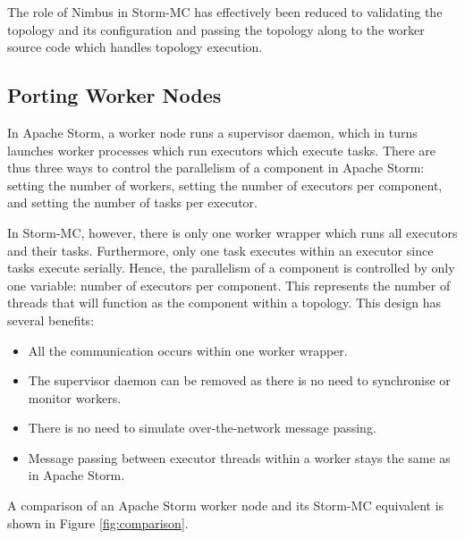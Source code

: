 \documentclass[bsc,logo,frontabs,twoside,singlespacing,normalheadings,parskip]{infthesis}\usepackage[]{graphicx}\usepackage[]{color}
\begin{document}
The role of Nimbus in Storm-MC has effectively been reduced to validating the topology and its configuration and passing the topology along to the worker source code which handles topology execution.

\subsection{Porting Worker Nodes}

In Apache Storm, a worker node runs a supervisor daemon, which in turns launches worker processes which run executors which execute tasks. There are thus three ways to control the parallelism of a component in Apache Storm: setting the number of workers, setting the number of executors per component, and setting the number of tasks per executor.

In Storm-MC, however, there is only one worker wrapper which runs all executors and their tasks. Furthermore, only one task executes within an executor since tasks execute serially. Hence, the parallelism of a component is controlled by only one variable: number of executors per component. This represents the number of threads that will function as the component within a topology. This design has several benefits:

\begin{itemize}
	\item All the communication occurs within one worker wrapper.
	\item The supervisor daemon can be removed as there is no need to synchronise or monitor workers.
	\item There is no need to simulate over-the-network message passing.
	\item Message passing between executor threads within a worker stays the same as in Apache Storm.
\end{itemize}

A comparison of an Apache Storm worker node and its Storm-MC equivalent is shown in Figure \ref{fig:comparison}.
\end{document}
